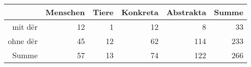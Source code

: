 \begin{tabular}{rrrrrr}
  \hline
 & Menschen & Tiere & Konkreta & Abstrakta & Summe \\ 
  \hline
mit dër & 12 & 1 & 12 & 8 & 33 \\ 
  ohne dër & 45 & 12 & 62 & 114 & 233 \\ 
  Summe & 57 & 13 & 74 & 122 & 266 \\ 
   \hline
\end{tabular}
